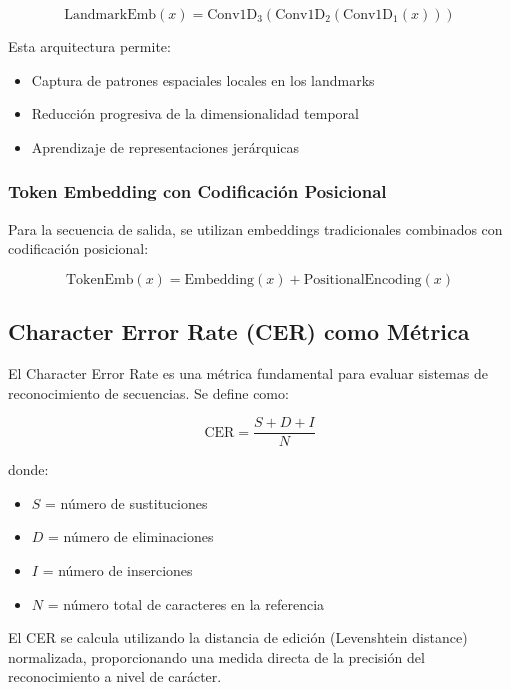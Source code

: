 \documentclass[12pt,a4paper]{article}
\begin{document}
\begin{equation}
\text{LandmarkEmb}(x) = \text{Conv1D}_3(\text{Conv1D}_2(\text{Conv1D}_1(x)))
\end{equation}

Esta arquitectura permite:
\begin{itemize}
    \item Captura de patrones espaciales locales en los landmarks
    \item Reducción progresiva de la dimensionalidad temporal
    \item Aprendizaje de representaciones jerárquicas
\end{itemize}

\subsubsection{Token Embedding con Codificación Posicional}

Para la secuencia de salida, se utilizan embeddings tradicionales combinados con codificación posicional:

\begin{equation}
\text{TokenEmb}(x) = \text{Embedding}(x) + \text{PositionalEncoding}(x)
\end{equation}

\subsection{Character Error Rate (CER) como Métrica}

El Character Error Rate es una métrica fundamental para evaluar sistemas de reconocimiento de secuencias. Se define como:

\begin{equation}
\text{CER} = \frac{S + D + I}{N}
\end{equation}

donde:
\begin{itemize}
    \item $S$ = número de sustituciones
    \item $D$ = número de eliminaciones  
    \item $I$ = número de inserciones
    \item $N$ = número total de caracteres en la referencia
\end{itemize}

El CER se calcula utilizando la distancia de edición (Levenshtein distance) normalizada, proporcionando una medida directa de la precisión del reconocimiento a nivel de carácter.
\end{document}
